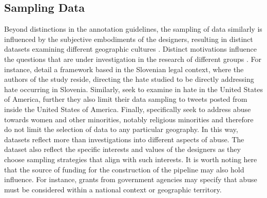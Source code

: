 {\subsection{Sampling Data}
Beyond distinctions in the annotation guidelines, the sampling of data similarly is influenced by the subjective embodiments of the designers, resulting in distinct datasets examining different geographic cultures \citep{Waseem:2018}.
Distinct motivations influence the questions that are under investigation in the research of different groups \citep{Waseem:2018}.
For instance, \citet{Fiser:2017} detail a framework based in the Slovenian legal context, where the authors of the study reside, directing the hate studied to be directly addressing hate occurring in Slovenia.
Similarly, \citet{Davidson:2017} seek to examine in hate in the United States of America, further they also limit their data sampling to tweets posted from inside the United States of America.
Finally, \citet{Waseem-Hovy:2016} specifically seek to address abuse towards women and other minorities, notably religious minorities and therefore do not limit the selection of data to any particular geography.
In this way, datasets reflect more than investigations into different aspects of abuse.
The dataset also reflect the specific interests and values of the designers as they choose sampling strategies that align with such interests.
It is worth noting here that the source of funding for the construction of the pipeline may also hold influence.
For instance, grants from government agencies may specify that abuse must be considered within a national context or geographic territory.

}
